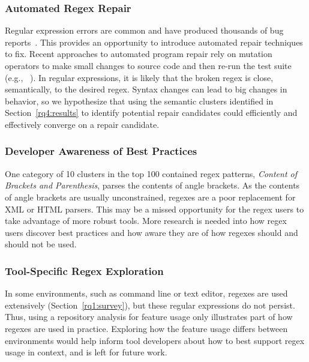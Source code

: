 \subsubsection{Automated Regex Repair}
Regular expression errors are common and have produced thousands of bug reports~\cite{Spishak:2012:TSR:2318202.2318207}. This provides an opportunity to introduce automated repair techniques to fix.
Recent approaches to automated program repair rely on mutation operators to make small changes to source code and then re-run the test suite (e.g., ~\cite{cacm10, genprog-tse-journal}). In regular expressions, it is likely that the broken regex is close, semantically, to the desired regex. Syntax changes can lead to big changes in behavior, so we hypothesize that using the semantic clusters identified in Section~\ref{rq4:results} to identify potential repair candidates could efficiently and effectively converge on a repair candidate.

\subsubsection{Developer Awareness of Best Practices}
One category of 10 clusters in the top 100 contained regex patterns, \emph{Content of Brackets and Parenthesis}, parses the contents of angle brackets.  As the contents of angle brackets are usually unconstrained, regexes are a poor replacement for XML or HTML parsers.  This may be a missed opportunity for the regex users to take advantage of more robust tools. More research is needed into how regex users discover best practices and how aware they are of how regexes should and should not be used.






\subsubsection{Tool-Specific Regex Exploration}
In some environments, such as command line or text editor, regexes are used extensively (Section~\ref{rq1:survey}), but these regular expressions do not persist. Thus, using a repository analysis for feature usage only illustrates part of how regexes are used in practice. Exploring how the feature usage differs between environments would help inform tool developers about how to best support regex usage in context, and is left for future work.


